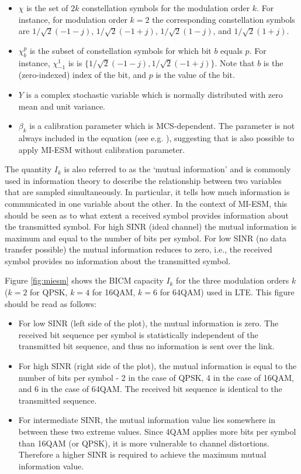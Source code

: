 \begin{itemize}
    \item $\chi$ is the set of $2k$ constellation symbols for the modulation order $k$. For instance, for modulation order $k = 2$ the corresponding constellation symbols are $1/\sqrt{2} (-1-j)$, $1/\sqrt{2} (-1+j)$, $1/\sqrt{2} (1-j)$, and $1/\sqrt{2} (1+j)$.
    \item $\chi^p_b$ is the subset of constellation symbols for which bit $b$ equals $p$. For instance, $\chi_{-1}^1$ is 
    is $\{1/\sqrt{2} (-1-j), 1/\sqrt{2} (-1+j)\}$. Note that $b$ is the (zero-indexed) index of the bit, and $p$ is the value of the bit.
    \item $Y$ is a complex stochastic variable which is normally distributed with zero mean and unit variance.
    \item $\beta_k$ is a calibration parameter which is MCS-dependent. The parameter is not always included in the equation (see e.g. \cite{miesm1}), suggesting that is also possible to apply MI-ESM without calibration parameter.
\end{itemize}


The quantity $I_k$ is also referred to as the `mutual information' and is commonly used in information theory to describe the relationship between two variables that are sampled simultaneously. In particular, it tells how much information is
communicated in one variable about the other. In the context of MI-ESM, this should be seen as to what extent a received symbol provides information about the transmitted symbol. For high SINR (ideal channel) the mutual information is
maximum and equal to the number of bits per symbol. For low SINR (no data transfer possible) the mutual information reduces to zero, i.e., the received symbol provides no information about the transmitted symbol. 

Figure \ref{fig:miesm} shows the BICM capacity $I_k$ for the three modulation orders $k$ ($k = 2$ for QPSK, $k = 4$ for 16QAM, $k = 6$ for 64QAM) used in LTE. This figure should be read as follows:

\begin{itemize}
    \item For low SINR (left side of the plot), the mutual information is zero. The received bit sequence per symbol is statistically independent of the transmitted bit sequence, and thus no information is sent over the link.
    \item For high SINR (right side of the plot), the mutual information is equal to the number of bits per symbol - 2 in the case of QPSK, 4 in the case of 16QAM, and 6 in the case of 64QAM. The received bit sequence is identical to the transmitted sequence.
    \item For intermediate SINR, the mutual information value lies somewhere in between these two extreme values. Since 4QAM applies more bits per symbol than 16QAM (or QPSK), it is more vulnerable to channel distortions. Therefore a higher SINR is required to achieve the maximum mutual information value. 

\end{itemize}


